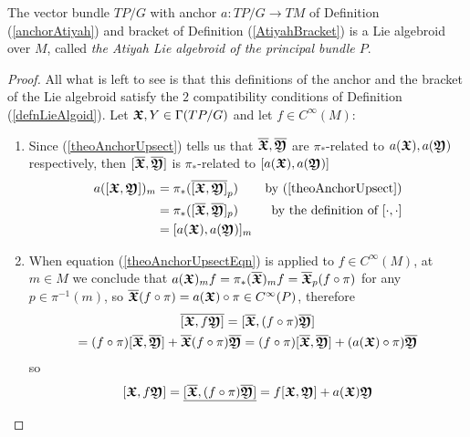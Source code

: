 \begin{theorem}
The vector bundle $TP/G$ with anchor $a:TP/G \to TM$ of Definition (\ref{anchorAtiyah}) and bracket of Definition (\ref{AtiyahBracket}) is a Lie algebroid over $M$, called \emph{the Atiyah Lie algebroid of the principal bundle $P$}.
\end{theorem}

\begin{proof}
All what is left to see is that this definitions of the anchor and the bracket of the Lie algebroid satisfy the $2$ compatibility conditions of Definition (\ref{defnLieAlgoid}). Let $\bm{\mathfrak{X}}, Y \in \Gamma(TP/G)$ and let $f \in C^{\infty}(M)$:

    \begin{enumerate}
    
    \item Since (\ref{theoAnchorUpsect}) tells us that $\overline{\bm{\mathfrak{X}}}, \overline{\bm{\mathfrak{Y}}}$ are $\pi_*$-related to $a(\bm{\mathfrak{X}}), a(\bm{\mathfrak{Y}})$ respectively, then $[\overline{\bm{\mathfrak{X}}}, \overline{\bm{\mathfrak{Y}}}]$ is $\pi_*$-related to $[a(\bm{\mathfrak{X}}), a(\bm{\mathfrak{Y}})]$
    \begin{align*}
        a([\bm{\mathfrak{X}}, \bm{\mathfrak{Y}}])_m &= \pi_*(\overline{[\bm{\mathfrak{X}}, \bm{\mathfrak{Y}}]}_p) & \textrm{by (\ref{theoAnchorUpsect})} \\
                                    &= \pi_*([\overline{\bm{\mathfrak{X}}}, \overline{ \bm{\mathfrak{Y}}}]_p) & \textrm{by the definition of $[\cdot, \cdot]$} \\
                                    &= [a(\bm{\mathfrak{X}}), a(\bm{\mathfrak{Y}})]_m 
    \end{align*}
    
    \item When equation (\ref{theoAnchorUpsectEqn}) is applied to $f \in C^\infty(M)$, at $m\in M$ we conclude that $a(\bm{\mathfrak{X}})_mf = \pi_*(\overline{\bm{\mathfrak{X}}})_m f = \overline{\bm{\mathfrak{X}}}_p(f \circ \pi)$ for any $p \in \pi^{-1}(m)$, so $\overline{\bm{\mathfrak{X}}}(f \circ \pi) = a(\bm{\mathfrak{X}}) \circ \pi \in C^\infty(P)$, therefore
    \begin{multline*}
        \overline{[\bm{\mathfrak{X}}, f \bm{\mathfrak{Y}}]} 
        =[\overline{\bm{\mathfrak{X}}}, (f \circ \pi) \overline{\bm{\mathfrak{Y}}}] \\
        = (f \circ \pi)[\overline{\bm{\mathfrak{X}}}, \overline{\bm{\mathfrak{Y}}}] + \overline{\bm{\mathfrak{X}}}(f \circ \pi) \overline{\bm{\mathfrak{Y}}} = 
        (f \circ \pi)[\overline{\bm{\mathfrak{X}}}, \overline{\bm{\mathfrak{Y}}}] + (a(\bm{\mathfrak{X}}) \circ \pi) \overline{\bm{\mathfrak{Y}}}
    \end{multline*} so 
    \[
        [\bm{\mathfrak{X}}, f \bm{\mathfrak{Y}}] = \underline{[\overline{\bm{\mathfrak{X}}}, (f \circ \pi) \overline{\bm{\mathfrak{Y}}}]} = f[\bm{\mathfrak{X}}, \bm{\mathfrak{Y}}] + a(\bm{\mathfrak{X}}) \bm{\mathfrak{Y}}
    \]
    
    \end{enumerate}

\end{proof}

